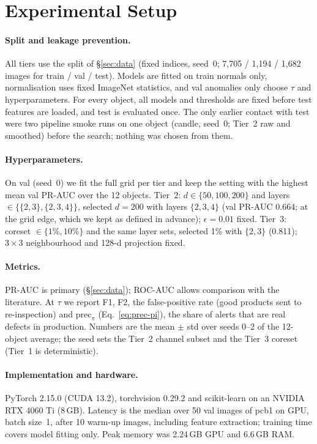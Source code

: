 \section{Experimental Setup}
\label{sec:setup}

\paragraph{Split and leakage prevention.}
All tiers use the split of \S\ref{sec:data} (fixed indices, seed~0; 7,705 / 1,194 / 1,682 images for
train / val / test).
Models are fitted on train normals only, normalisation uses fixed ImageNet statistics, and val
anomalies only choose $\tau$ and hyperparameters.
For every object, all models and thresholds are fixed before test features are loaded, and test is
evaluated once.
The only earlier contact with test were two pipeline smoke runs on one object (candle, seed~0; Tier~2
raw and smoothed) before the search; nothing was chosen from them.

\paragraph{Hyperparameters.}
On val (seed~0) we fit the full grid per tier and keep the setting with the highest mean val PR-AUC
over the 12 objects.
Tier~2: $d \in \{50, 100, 200\}$ and layers $\in \{\{2,3\}, \{2,3,4\}\}$, selected $d = 200$ with
layers $\{2,3,4\}$ (val PR-AUC 0.664; at the grid edge, which we kept as defined in advance);
$\epsilon = 0.01$ fixed.
Tier~3: coreset $\in \{1\%, 10\%\}$ and the same layer sets, selected 1\% with $\{2,3\}$ (0.811);
$3 \times 3$ neighbourhood and 128-d projection fixed.

\paragraph{Metrics.}
PR-AUC is primary (\S\ref{sec:data}); ROC-AUC allows comparison with the literature.
At $\tau$ we report F1, F2, the false-positive rate (good products sent to re-inspection) and
$\mathrm{prec}_\pi$ (Eq.~\ref{eq:prec-pi}), the share of alerts that are real defects in production.
Numbers are the mean $\pm$ std over seeds 0--2 of the 12-object average; the seed sets the Tier~2
channel subset and the Tier~3 coreset (Tier~1 is deterministic).

\paragraph{Implementation and hardware.}
PyTorch 2.15.0 (CUDA 13.2), torchvision 0.29.2 and scikit-learn on an NVIDIA RTX 4060 Ti (8\,GB).
Latency is the median over 50 val images of pcb1 on GPU, batch size~1, after 10 warm-up images,
including feature extraction; training time covers model fitting only.
Peak memory was 2.24\,GB GPU and 6.6\,GB RAM.
